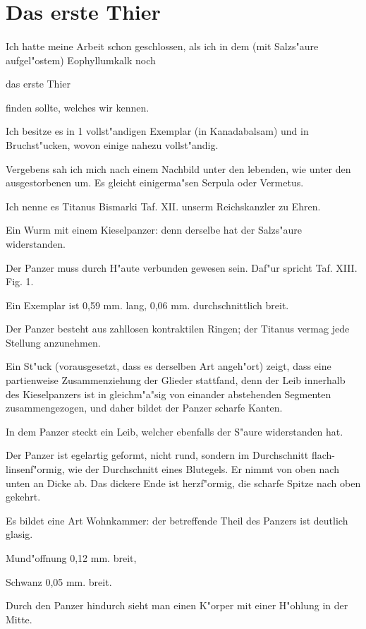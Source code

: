 \documentclass[a4paper, 11pt, oneside, german]{article}
\begin{document}
\section{Das erste Thier}
\paragraph{}
Ich hatte meine Arbeit schon geschlossen, als ich in dem (mit Salzs"aure aufgel"ostem) Eophyllumkalk noch

das erste Thier

finden sollte, welches wir kennen.

Ich besitze es in 1 vollst"andigen Exemplar (in Kanadabalsam) und in Bruchst"ucken, wovon einige nahezu vollst"andig.

Vergebens sah ich mich nach einem Nachbild unter den lebenden, wie unter den ausgestorbenen um. Es gleicht einigerma"sen Serpula oder Vermetus.

Ich nenne es Titanus Bismarki Taf. XII. unserm Reichskanzler zu Ehren.

Ein Wurm mit einem Kieselpanzer: denn derselbe hat der Salzs"aure widerstanden.

Der Panzer muss durch H"aute verbunden gewesen sein. Daf"ur spricht Taf. XIII. Fig. 1.

Ein Exemplar ist 0,59 mm. lang, 0,06 mm. durchschnittlich breit.

Der Panzer besteht aus zahllosen kontraktilen Ringen; der Titanus vermag jede Stellung anzunehmen.

Ein St"uck (vorausgesetzt, dass es derselben Art angeh"ort) zeigt, dass eine partienweise Zusammenziehung der Glieder stattfand, denn der Leib innerhalb des Kieselpanzers ist in gleichm"a"sig von einander abstehenden Segmenten zusammengezogen, und daher bildet der Panzer scharfe Kanten.

In dem Panzer steckt ein Leib, welcher ebenfalls der S"aure widerstanden hat.

Der Panzer ist egelartig geformt, nicht rund, sondern im Durchschnitt flach-linsenf"ormig, wie der Durchschnitt eines Blutegels. Er nimmt von oben nach unten an Dicke ab. Das dickere Ende ist herzf"ormig, die scharfe Spitze nach oben gekehrt.

Es bildet eine Art Wohnkammer: der betreffende Theil des Panzers ist deutlich glasig.

Mund"offnung 0,12 mm. breit,

Schwanz 0,05 mm. breit.

Durch den Panzer hindurch sieht man einen K"orper mit einer H"ohlung in der Mitte.
\end{document}
